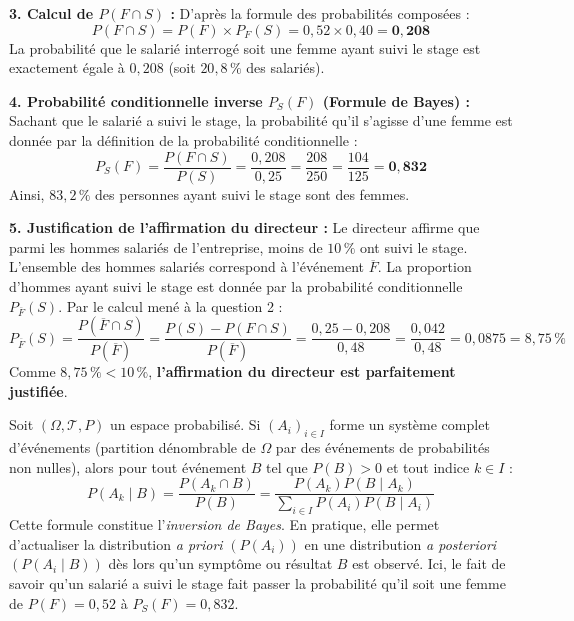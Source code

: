 \documentclass[11pt,a4paper]{article}
\begin{document}
\begin{correctionbox}
\begin{center}
\end{center}

\textbf{3. Calcul de $P(F \cap S)$ :}
D'après la formule des probabilités composées :
\[
P(F \cap S) = P(F) \times P_F(S) = 0{,}52 \times 0{,}40 = \mathbf{0{,}208}
\]
La probabilité que le salarié interrogé soit une femme ayant suivi le stage est exactement égale à $0{,}208$ (soit $20{,}8\,\%$ des salariés).

\textbf{4. Probabilité conditionnelle inverse $P_S(F)$ (Formule de Bayes) :}
Sachant que le salarié a suivi le stage, la probabilité qu'il s'agisse d'une femme est donnée par la définition de la probabilité conditionnelle :
\[
P_S(F) = \frac{P(F \cap S)}{P(S)} = \frac{0{,}208}{0{,}25} = \frac{208}{250} = \frac{104}{125} = \mathbf{0{,}832}
\]
Ainsi, $83{,}2\,\%$ des personnes ayant suivi le stage sont des femmes.

\textbf{5. Justification de l'affirmation du directeur :}
Le directeur affirme que parmi les hommes salariés de l'entreprise, moins de $10\,\%$ ont suivi le stage.
L'ensemble des hommes salariés correspond à l'événement $\overline{F}$. La proportion d'hommes ayant suivi le stage est donnée par la probabilité conditionnelle $P_{\overline{F}}(S)$.
Par le calcul mené à la question 2 :
\[
P_{\overline{F}}(S) = \frac{P(\overline{F} \cap S)}{P(\overline{F})} = \frac{P(S) - P(F \cap S)}{P(\overline{F})} = \frac{0{,}25 - 0{,}208}{0{,}48} = \frac{0{,}042}{0{,}48} = 0{,}0875 = 8{,}75\,\%
\]
Comme $8{,}75\,\% < 10\,\%$, \textbf{l'affirmation du directeur est parfaitement justifiée}.
\end{correctionbox}

\begin{remarquebox}
Soit $(\Omega, \mathscr{T}, P)$ un espace probabilisé. Si $(A_i)_{i \in I}$ forme un système complet d'événements (partition dénombrable de $\Omega$ par des événements de probabilités non nulles), alors pour tout événement $B$ tel que $P(B) > 0$ et tout indice $k \in I$ :
\[
P(A_k \mid B) = \frac{P(A_k \cap B)}{P(B)} = \frac{P(A_k) P(B \mid A_k)}{\displaystyle\sum_{i \in I} P(A_i) P(B \mid A_i)}
\]
Cette formule constitue l'\emph{inversion de Bayes}. En pratique, elle permet d'actualiser la distribution \emph{a priori} $(P(A_i))$ en une distribution \emph{a posteriori} $(P(A_i \mid B))$ dès lors qu'un symptôme ou résultat $B$ est observé. Ici, le fait de savoir qu'un salarié a suivi le stage fait passer la probabilité qu'il soit une femme de $P(F) = 0{,}52$ à $P_S(F) = 0{,}832$.
\end{remarquebox}
\end{document}
